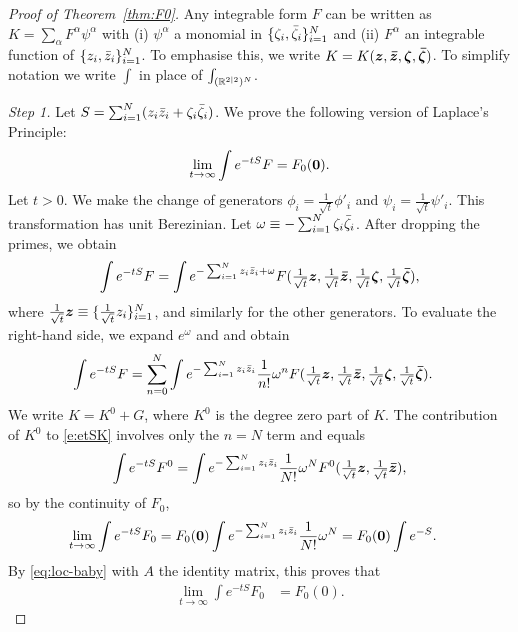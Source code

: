 \documentclass[11pt,a4paper]{article}
\begin{document}
\begin{proof}[Proof of Theorem~\ref{thm:F0}]
Any integrable form $F$ can be written as
$K=\sum_{\alpha}F^{\alpha}\psi^{\alpha}$ with (i) $\psi^{\alpha}$  a
monomial in $\{\zeta_{i},\bar \zeta_{i}\}_{i=1}^{N}$ and (ii)
$F^{\alpha}$ an integrable function of $\{z_{i},\bar z_{i}\}_{i=1}^{N}$.
To emphasise this, we write $K=K(\boldsymbol{z}, \boldsymbol{\bar z}, \boldsymbol{\zeta},\boldsymbol{\bar \zeta})$.
To simplify notation we write $\int$ in place of $\int_{(\mathbb{R}^{2|2})^{N}}$.

\smallskip\noindent
\emph{Step 1.}
Let $S= \sum_{i=1}^{N} (z_i\bar z_i + \zeta_i \bar \zeta_i)$. 
We prove the following version of Laplace's Principle:
\begin{equation} \label{e:localisation-Laplace}
  \lim_{t\to\infty} \int e^{-t S}F = F_0(\boldsymbol{0}) .
\end{equation}
Let $t>0$.
We make the change of generators
$\phi_{i} = \frac{1}{\sqrt{t}}\phi'_{i}$ and $\psi_{i} = \frac{1}{\sqrt{t}}\psi'_{i}$.
This transformation has unit Berezinian.
Let $\omega \equiv - \sum_{i=1}^{N}\zeta_{i} \bar \zeta_{i}$. 
After dropping the primes, we obtain
\begin{equation}
    \int e^{-t S}F
    =
    \int e^{-\sum_{i=1}^{N}z_{i} \bar z_{i} + \omega}
    F(
    \tfrac{1}{\sqrt{t}}\boldsymbol{z},
    \tfrac{1}{\sqrt{t}}\boldsymbol{\bar z},
    \tfrac{1}{\sqrt{t}}\boldsymbol{\zeta},
    \tfrac{1}{\sqrt{t}}\boldsymbol{\bar \zeta}) ,
\end{equation}
where $\tfrac{1}{\sqrt{t}}\boldsymbol{z} \equiv \{\tfrac{1}{\sqrt{t}}z_i\}_{i=1}^N$,
and similarly for the other generators.
To evaluate the right-hand side, we expand $e^{\omega}$ and and obtain
\begin{align}
\label{e:etSK}
    \int e^{-t S}F
    &=
    \sum_{n=0}^{N}
    \int e^{-\sum_{i=1}^{N}z_{i} \bar z_{i}} \frac{1}{n!}\omega^{n}
    F(
    \tfrac{1}{\sqrt{t}}\boldsymbol{z},
    \tfrac{1}{\sqrt{t}}\boldsymbol{\bar z},
    \tfrac{1}{\sqrt{t}}\boldsymbol{\zeta},
    \tfrac{1}{\sqrt{t}}\boldsymbol{\bar \zeta})
    .
\end{align}
We write $K=K^0+G$,  where $K^0$ is the degree zero part of $K$.
The contribution of $K^0$ to \eqref{e:etSK} involves only the
$n=N$ term and equals
\begin{equation} \label{e:etSK0}
  \int e^{-t S}F^0 =
  \int e^{-\sum_{i=1}^{N}z_{i} \bar z_{i}} \frac{1}{N!} \omega^{N}
    F^0(
    \tfrac{1}{\sqrt{t}}\boldsymbol{z},
    \tfrac{1}{\sqrt{t}}\boldsymbol{\bar z})
    ,
\end{equation}
so by the continuity of $F_0$,
\begin{align}
    \lim_{t\to\infty}
    \int e^{-t S}F_0
    &=
    F_{0}(\boldsymbol{0})
    \int e^{-\sum_{i=1}^{N}z_{i} \bar z_{i}} \frac{1}{N!}\omega^{N}
    =
    F_{0}(\boldsymbol{0})
    \int e^{- S}
    .
\end{align}
By \eqref{eq:loc-baby} with $A$ the identity matrix,
this proves that
\begin{align}
    \lim_{t\to\infty}
    \int e^{-t S}F_0
    &=
    F_{0}(0)
    .
\end{align}


\end{proof}
\end{document}
